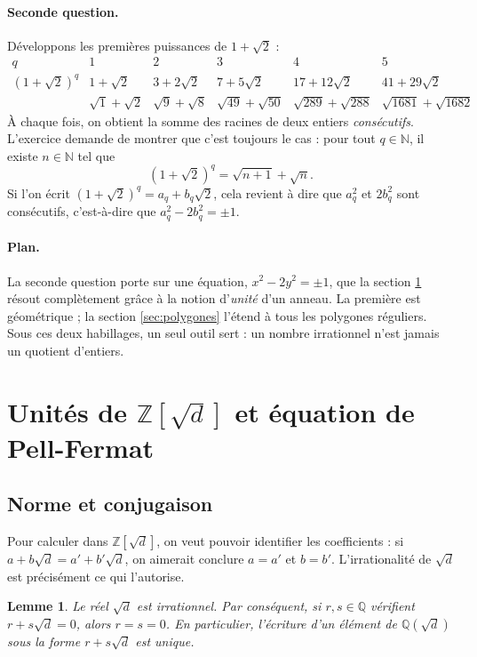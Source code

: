 \documentclass[11pt,a4paper]{article}
\theoremstyle{plain}
\newtheorem{lemme}[theoreme]{Lemme}
\theoremstyle{definition}
\theoremstyle{remark}
\newcommand{\N}{\mathbb{N}}
\newcommand{\Z}{\mathbb{Z}}
\newcommand{\Q}{\mathbb{Q}}
\begin{document}
\paragraph{Seconde question.} Développons les premières puissances de $1+\sqrt2$ :
\[
\begin{array}{c|ccccc}
q&1&2&3&4&5\\\hline
(1+\sqrt2)^q&1+\sqrt2&3+2\sqrt2&7+5\sqrt2&17+12\sqrt2&41+29\sqrt2\\
&\sqrt1+\sqrt2&\sqrt9+\sqrt8&\sqrt{49}+\sqrt{50}&\sqrt{289}+\sqrt{288}&\sqrt{1681}+\sqrt{1682}
\end{array}
\]
À chaque fois, on obtient la somme des racines de deux entiers \emph{consécutifs}. L'exercice demande de montrer que c'est toujours le cas : pour tout $q\in\N$, il existe $n\in\N$ tel que
\[
  (1+\sqrt2)^q=\sqrt{n+1}+\sqrt n .
\]
Si l'on écrit $(1+\sqrt2)^q=a_q+b_q\sqrt2$, cela revient à dire que $a_q^2$ et $2b_q^2$ sont consécutifs, c'est-à-dire que $a_q^2-2b_q^2=\pm1$.

\paragraph{Plan.} La seconde question porte sur une équation, $x^2-2y^2=\pm1$, que la section \ref{sec:unites} résout complètement grâce à la notion d'\emph{unité} d'un anneau. La première est géométrique ; la section \ref{sec:polygones} l'étend à tous les polygones réguliers. Sous ces deux habillages, un seul outil sert : un nombre irrationnel n'est jamais un quotient d'entiers.

\section{Unités de \texorpdfstring{$\Z[\sqrt d]$}{Z[sqrt d]} et équation de Pell-Fermat}\label{sec:unites}

\subsection{Norme et conjugaison}

Pour calculer dans $\Z[\sqrt d]$, on veut pouvoir identifier les coefficients : si $a+b\sqrt d=a'+b'\sqrt d$, on aimerait conclure $a=a'$ et $b=b'$. L'irrationalité de $\sqrt d$ est précisément ce qui l'autorise.

\begin{lemme}\label{lem:irr}
Le réel $\sqrt d$ est irrationnel. Par conséquent, si $r,s\in\Q$ vérifient $r+s\sqrt d=0$, alors $r=s=0$. En particulier, l'écriture d'un élément de $\Q(\sqrt d)$ sous la forme $r+s\sqrt d$ est unique.
\end{lemme}
\end{document}
